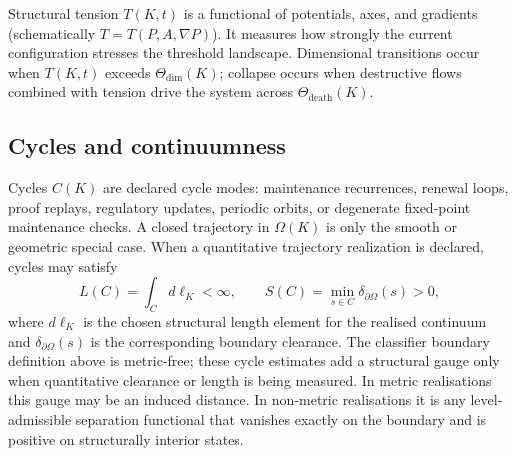 Structural tension \(T(K,t)\) is a functional of potentials, axes, and gradients (schematically \(T=T(P,A,\nabla P)\)).
It measures how strongly the current configuration stresses the threshold landscape.
Dimensional transitions occur when \(T(K,t)\) exceeds \(\Theta_{\mathrm{dim}}(K)\); collapse occurs when destructive flows combined with tension drive the system across \(\Theta_{\mathrm{death}}(K)\).

\subsection{Cycles and continuumness}

Cycles \(C(K)\) are declared cycle modes: maintenance recurrences, renewal
loops, proof replays, regulatory updates, periodic orbits, or degenerate
fixed-point maintenance checks. A closed trajectory in \(\Omega(K)\) is only
the smooth or geometric special case.
When a quantitative trajectory realization is declared, cycles may satisfy
\[
    L(C) = \int_C d\ell_K < \infty,\qquad
    S(C) = \min_{s \in C} \delta_{\partial\Omega}(s) > 0,
\]
where \(d\ell_K\) is the chosen structural length element for the realised
continuum and \(\delta_{\partial\Omega}(s)\) is the corresponding boundary
clearance.
The classifier boundary definition above is metric-free; these cycle estimates
add a structural gauge only when quantitative clearance or length is being measured.
In metric realisations this gauge may be an induced distance. In non-metric
realisations it is any level-admissible separation functional that vanishes
exactly on the boundary and is positive on structurally interior states.

